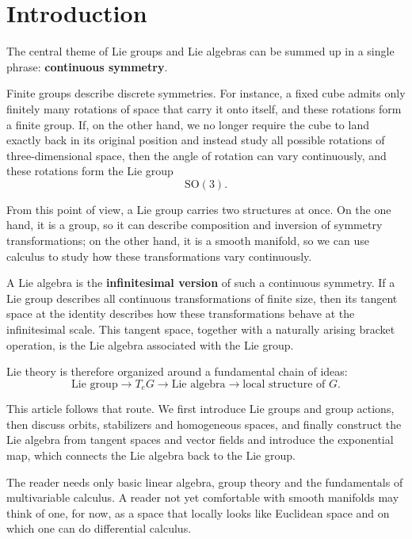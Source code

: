 \documentclass[11pt]{article}
\begin{document}
\maketitle

\section*{Introduction}

The central theme of Lie groups and Lie algebras can be summed up in a single phrase: \textbf{continuous symmetry}.

Finite groups describe discrete symmetries. For instance, a fixed cube admits only finitely many rotations of space that carry it onto itself, and these rotations form a finite group. If, on the other hand, we no longer require the cube to land exactly back in its original position and instead study all possible rotations of three-dimensional space, then the angle of rotation can vary continuously, and these rotations form the Lie group
\[
\mathrm{SO}(3).
\]

From this point of view, a Lie group carries two structures at once. On the one hand, it is a group, so it can describe composition and inversion of symmetry transformations; on the other hand, it is a smooth manifold, so we can use calculus to study how these transformations vary continuously.

A Lie algebra is the \textbf{infinitesimal version} of such a continuous symmetry. If a Lie group describes all continuous transformations of finite size, then its tangent space at the identity describes how these transformations behave at the infinitesimal scale. This tangent space, together with a naturally arising bracket operation, is the Lie algebra associated with the Lie group.

Lie theory is therefore organized around a fundamental chain of ideas:
\[
\text{Lie group}
\longrightarrow
T_eG
\longrightarrow
\text{Lie algebra}
\longrightarrow
\text{local structure of }G.
\]

This article follows that route. We first introduce Lie groups and group actions, then discuss orbits, stabilizers and homogeneous spaces, and finally construct the Lie algebra from tangent spaces and vector fields and introduce the exponential map, which connects the Lie algebra back to the Lie group.

The reader needs only basic linear algebra, group theory and the fundamentals of multivariable calculus. A reader not yet comfortable with smooth manifolds may think of one, for now, as a space that locally looks like Euclidean space and on which one can do differential calculus.
\end{document}
